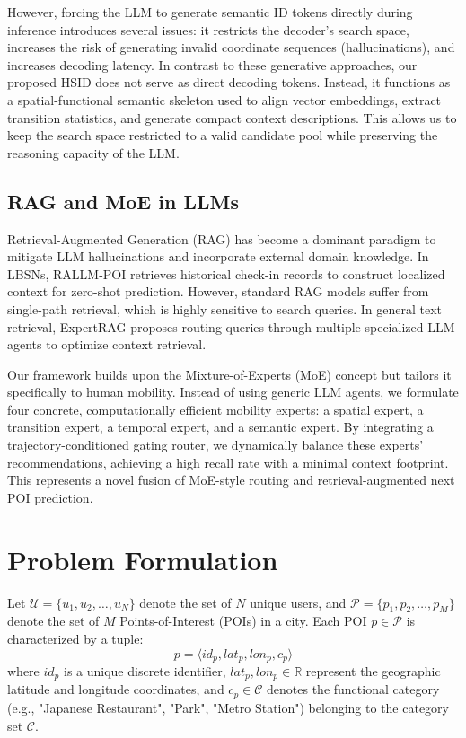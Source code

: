 \documentclass[10pt,twocolumn]{article}
\newcommand{\hsid}{HSID}
\begin{document}
However, forcing the LLM to generate semantic ID tokens directly during inference introduces several issues: it restricts the decoder's search space, increases the risk of generating invalid coordinate sequences (hallucinations), and increases decoding latency. In contrast to these generative approaches, our proposed \hsid{} does not serve as direct decoding tokens. Instead, it functions as a spatial-functional semantic skeleton used to align vector embeddings, extract transition statistics, and generate compact context descriptions. This allows us to keep the search space restricted to a valid candidate pool while preserving the reasoning capacity of the LLM.

\subsection{RAG and MoE in LLMs}
Retrieval-Augmented Generation (RAG) has become a dominant paradigm to mitigate LLM hallucinations and incorporate external domain knowledge. In LBSNs, RALLM-POI \cite{rallmpoi} retrieves historical check-in records to construct localized context for zero-shot prediction. However, standard RAG models suffer from single-path retrieval, which is highly sensitive to search queries. In general text retrieval, ExpertRAG \cite{expertrag} proposes routing queries through multiple specialized LLM agents to optimize context retrieval.

Our framework builds upon the Mixture-of-Experts (MoE) concept but tailors it specifically to human mobility. Instead of using generic LLM agents, we formulate four concrete, computationally efficient mobility experts: a spatial expert, a transition expert, a temporal expert, and a semantic expert. By integrating a trajectory-conditioned gating router, we dynamically balance these experts' recommendations, achieving a high recall rate with a minimal context footprint. This represents a novel fusion of MoE-style routing and retrieval-augmented next POI prediction.

\section{Problem Formulation}
Let $\mathcal{U} = \{u_1, u_2, \dots, u_N\}$ denote the set of $N$ unique users, and $\mathcal{P} = \{p_1, p_2, \dots, p_M\}$ denote the set of $M$ Points-of-Interest (POIs) in a city. Each POI $p \in \mathcal{P}$ is characterized by a tuple:
\begin{equation}
    p = \langle id_p, lat_p, lon_p, c_p \rangle
\end{equation}
where $id_p$ is a unique discrete identifier, $lat_p, lon_p \in \mathbb{R}$ represent the geographic latitude and longitude coordinates, and $c_p \in \mathcal{C}$ denotes the functional category (e.g., "Japanese Restaurant", "Park", "Metro Station") belonging to the category set $\mathcal{C}$.
\end{document}
